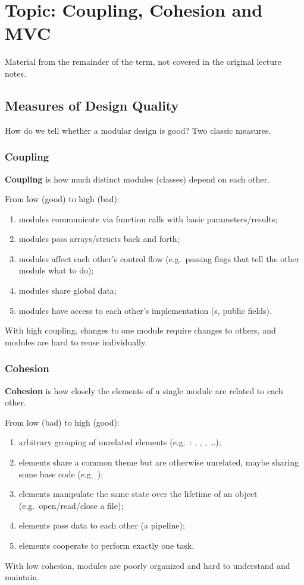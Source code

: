 \chapter{Topic: Coupling, Cohesion and MVC}

\begin{aside}
Material from the remainder of the term, not covered in the original lecture
notes.
\end{aside}

\section{Measures of Design Quality}
How do we tell whether a modular design is good? Two classic measures.

\subsection{Coupling}
\begin{definition}
\textbf{Coupling} is how much distinct modules (classes) depend on each other.
\end{definition}
From low (good) to high (bad):
\begin{enumerate}
  \item modules communicate via function calls with basic parameters/results;
  \item modules pass arrays/structs back and forth;
  \item modules affect each other's control flow (e.g.\ passing flags that tell
        the other module what to do);
  \item modules share global data;
  \item modules have access to each other's implementation (s,
        public fields).
\end{enumerate}
With high coupling, changes to one module require changes to others, and modules
are hard to reuse individually.

\subsection{Cohesion}
\begin{definition}
\textbf{Cohesion} is how closely the elements of a single module are related to
each other.
\end{definition}
From low (bad) to high (good):
\begin{enumerate}
  \item arbitrary grouping of unrelated elements (e.g.\ :
        , , , \dots);
  \item elements share a common theme but are otherwise unrelated, maybe sharing
        some base code (e.g.\ );
  \item elements manipulate the same state over the lifetime of an object (e.g.\
        open/read/close a file);
  \item elements pass data to each other (a pipeline);
  \item elements cooperate to perform exactly one task.
\end{enumerate}
With low cohesion, modules are poorly organized and hard to understand and
maintain.


